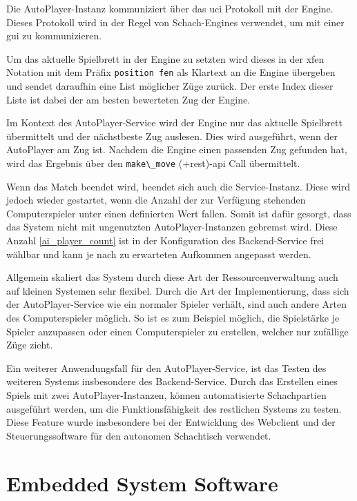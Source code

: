 Die AutoPlayer-Instanz kommuniziert über das \gls{uci}
Protokoll\cite{uciprotocol} mit der Engine. Dieses Protokoll wird in
der Regel von Schach-Engines verwendet, um mit einer \gls{gui} zu
kommunizieren.

Um das aktuelle Spielbrett in der Engine zu setzten wird dieses in der
\gls{xfen} Notation mit dem Präfix
\passthrough{\lstinline!position fen!} als Klartext an die Engine
übergeben und sendet daraufhin eine List möglicher Züge zurück. Der
erste Index dieser Liste ist dabei der am besten bewerteten Zug der
Engine.

Im Kontext des AutoPlayer-Service wird der Engine nur das aktuelle
Spielbrett übermittelt und der nächstbeste Zug auslesen. Dies wird
ausgeführt, wenn der AutoPlayer am Zug ist. Nachdem die Engine einen
passenden Zug gefunden hat, wird das Ergebnis über den
\passthrough{\lstinline!make\_move!} (+rest)-\gls{api} Call übermittelt.

Wenn das Match beendet wird, beendet sich auch die Service-Instanz.
Diese wird jedoch wieder gestartet, wenn die Anzahl der zur Verfügung
stehenden Computerspieler unter einen definierten Wert fallen. Somit ist
dafür gesorgt, dass das System nicht mit ungenutzten
AutoPlayer-Instanzen gebremst wird. Diese Anzahl \ref{ai_player_count}
ist in der Konfiguration des Backend-Service frei wählbar und kann je
nach zu erwarteten Aufkommen angepasst werden.

Allgemein skaliert das System durch diese Art der Ressourcenverwaltung
auch auf kleinen Systemen sehr flexibel. Durch die Art der
Implementierung, dass sich der AutoPlayer-Service wie ein normaler
Spieler verhält, sind auch andere Arten des Computerspieler möglich. So
ist es zum Beispiel möglich, die Spielstärke je Spieler anzupassen oder
einen Computerspieler zu erstellen, welcher nur zufällige Züge zieht.

Ein weiterer Anwendungsfall für den AutoPlayer-Service, ist das Testen
des weiteren Systems insbesondere des Backend-Service. Durch das
Erstellen eines Spiels mit zwei AutoPlayer-Instanzen, können
automatisierte Schachpartien ausgeführt werden, um die
Funktionsfähigkeit des restlichen Systems zu testen. Diese Feature wurde
insbesondere bei der Entwicklung des Webclient und der
Steuerungssoftware für den autonomen Schachtisch verwendet.

\hypertarget{embedded-system-software}{%
\chapter{Embedded System Software}\label{embedded-system-software}}

